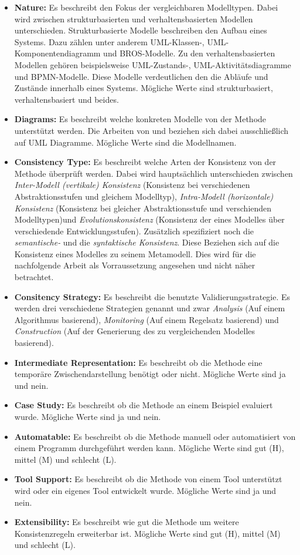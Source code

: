 \begin{itemize}
    \item \textbf{Nature:} Es beschreibt den Fokus der vergleichbaren Modelltypen. Dabei wird zwischen strukturbasierten und verhaltensbasierten Modellen unterschieden. Strukturbasierte Modelle beschreiben den Aufbau eines Systems. Dazu zählen unter anderem UML-Klassen-, UML-Komponentendiagramm und BROS-Modelle. Zu den verhaltensbasierten Modellen gehören beispielsweise UML-Zustands-, UML-Aktivitätsdiagramme und BPMN-Modelle. Diese Modelle verdeutlichen den die Abläufe und Zustände innerhalb eines Systems. Mögliche Werte sind strukturbasiert, verhaltensbasiert und beides.
    \item \textbf{Diagrams:} Es beschreibt welche konkreten Modelle von der Methode unterstützt werden. Die Arbeiten von \cite{Usman2008} und \cite{Lucas2009} beziehen sich dabei ausschließlich auf UML Diagramme. Mögliche Werte sind die Modellnamen.
    \item \textbf{Consistency Type:} Es beschreibt welche Arten der Konsistenz von der Methode überprüft werden. Dabei wird hauptsächlich unterschieden zwischen \emph{Inter-Modell (vertikale) Konsistenz} (Konsistenz bei verschiedenen Abstraktionsstufen und gleichem Modelltyp), \emph{Intra-Modell (horizontale) Konsistenz} (Konsistenz bei gleicher Abstraktionsstufe und verschienden Modelltypen)und \emph{Evolutionskonsistenz} (Konsistenz der eines Modelles über verschiedende Entwicklungsstufen). Zusätzlich spezifiziert \cite{Usman2008} noch die \emph{semantische-} und die \emph{syntaktische Konsistenz}. Diese Beziehen sich auf die Konsistenz eines Modelles zu seinem Metamodell. Dies wird für die nachfolgende Arbeit als Vorraussetzung angesehen und nicht näher betrachtet.
    \item \textbf{Consitency Strategy:} Es beschreibt die benutzte Validierungsstrategie. Es werden drei verschiedene Strategien genannt und zwar \emph{Analysis} (Auf einem Algorithmus basierend), \emph{Monitoring} (Auf einem Regelsatz basierend) und \emph{Construction} (Auf der Generierung des zu vergleichenden Modelles basierend).
    \item \textbf{Intermediate Representation:} Es beschreibt ob die Methode eine temporäre Zwischendarstellung benötigt oder nicht. Mögliche Werte sind ja und nein. 
    \item \textbf{Case Study:} Es beschreibt ob die Methode an einem Beispiel evaluiert wurde. Mögliche Werte sind ja und nein. 
    \item \textbf{Automatable:} Es beschreibt ob die Methode manuell oder automatisiert von einem Programm durchgeführt werden kann. Mögliche Werte sind gut (H), mittel (M) und schlecht (L).
    \item \textbf{Tool Support:} Es beschreibt ob die Methode von einem Tool unterstützt wird oder ein eigenes Tool entwickelt wurde. Mögliche Werte sind ja und nein.
    \item \textbf{Extensibility:} Es beschreibt wie gut die Methode um weitere Konsistenzregeln erweiterbar ist. Mögliche Werte sind gut (H), mittel (M) und schlecht (L).
\end{itemize}

